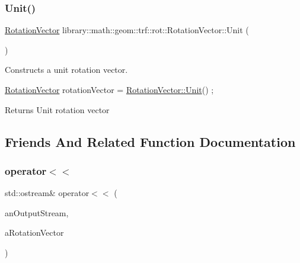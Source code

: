 \subsubsection{\texorpdfstring{Unit()}{Unit()}}
{\footnotesize\ttfamily \hyperlink{classlibrary_1_1math_1_1geom_1_1trf_1_1rot_1_1_rotation_vector}{Rotation\+Vector} library\+::math\+::geom\+::trf\+::rot\+::\+Rotation\+Vector\+::\+Unit (\begin{DoxyParamCaption}{ }\end{DoxyParamCaption})\hspace{0.3cm}{\ttfamily [static]}}



Constructs a unit rotation vector. 


\begin{DoxyCode}
\hyperlink{classlibrary_1_1math_1_1geom_1_1trf_1_1rot_1_1_rotation_vector_a32b1fab5e81bc24d777324daf5849205}{RotationVector} rotationVector = \hyperlink{classlibrary_1_1math_1_1geom_1_1trf_1_1rot_1_1_rotation_vector_a6dd13d867fa6080a5d45be164ce30c9b}{RotationVector::Unit}() ;
\end{DoxyCode}


\begin{DoxyReturn}{Returns}
Unit rotation vector 
\end{DoxyReturn}


\subsection{Friends And Related Function Documentation}
\mbox{\label{classlibrary_1_1math_1_1geom_1_1trf_1_1rot_1_1_rotation_vector_aa66ba2fd706a441ee39d06857842ecfe}} 
\subsubsection{\texorpdfstring{operator$<$$<$}{operator<<}}
{\footnotesize\ttfamily std\+::ostream\& operator$<$$<$ (\begin{DoxyParamCaption}\item[{std\+::ostream \&}]{an\+Output\+Stream,  }\item[{const \hyperlink{classlibrary_1_1math_1_1geom_1_1trf_1_1rot_1_1_rotation_vector}{Rotation\+Vector} \&}]{a\+Rotation\+Vector }\end{DoxyParamCaption})\hspace{0.3cm}{\ttfamily [friend]}}



